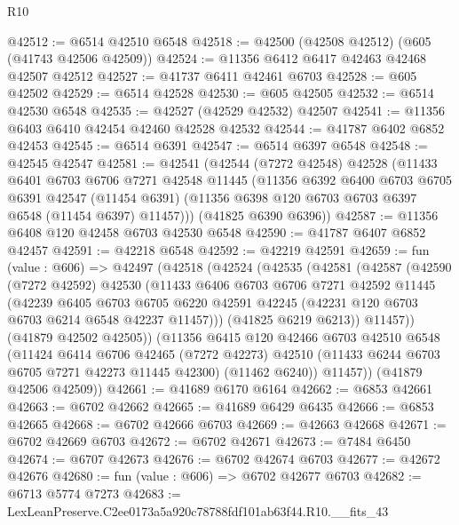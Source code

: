 \begin{lexlean}{R10}
\begin{coremodule}
@42512 := @6514 @42510 @6548
@42518 := @42500 (@42508 @42512) (@605 (@41743 @42506 @42509))
@42524 := @11356 @6412 @6417 @42463 @42468 @42507 @42512
@42527 := @41737 @6411 @42461 @6703
@42528 := @605 @42502
@42529 := @6514 @42528
@42530 := @605 @42505
@42532 := @6514 @42530 @6548
@42535 := @42527 (@42529 @42532) @42507
@42541 := @11356 @6403 @6410 @42454 @42460 @42528 @42532
@42544 := @41787 @6402 @6852 @42453
@42545 := @6514 @6391
@42547 := @6514 @6397 @6548
@42548 := @42545 @42547
@42581 := @42541
    (@42544
      (@7272 @42548)
      @42528
      (@11433
        @6401
        @6703
        @6706
        @7271
        @42548
        @11445
        (@11356
          @6392
          @6400
          @6703
          @6705
          @6391
          @42547
          (@11454 @6391)
          (@11356 @6398 @120 @6703 @6703 @6397 @6548 (@11454 @6397) @11457)))
      (@41825 @6390 @6396))
@42587 := @11356 @6408 @120 @42458 @6703 @42530 @6548
@42590 := @41787 @6407 @6852 @42457
@42591 := @42218 @6548
@42592 := @42219 @42591
@42659 := fun (value : @606) =>
  @42497
    (@42518
      (@42524
        (@42535
          (@42581
            (@42587
              (@42590
                (@7272 @42592)
                @42530
                (@11433
                  @6406
                  @6703
                  @6706
                  @7271
                  @42592
                  @11445
                  (@42239
                    @6405
                    @6703
                    @6705
                    @6220
                    @42591
                    @42245
                    (@42231 @120 @6703 @6703 @6214 @6548 @42237 @11457)))
                (@41825 @6219 @6213))
              @11457))
          (@41879 @42502 @42505))
        (@11356
          @6415
          @120
          @42466
          @6703
          @42510
          @6548
          (@11424
            @6414
            @6706
            @42465
            (@7272 @42273)
            @42510
            (@11433 @6244 @6703 @6705 @7271 @42273 @11445 @42300)
            (@11462 @6240))
          @11457))
      (@41879 @42506 @42509))
@42661 := @41689 @6170 @6164
@42662 := @6853 @42661
@42663 := @6702 @42662
@42665 := @41689 @6429 @6435
@42666 := @6853 @42665
@42668 := @6702 @42666 @6703
@42669 := @42663 @42668
@42671 := @6702 @42669 @6703
@42672 := @6702 @42671
@42673 := @7484 @6450
@42674 := @6707 @42673
@42676 := @6702 @42674 @6703
@42677 := @42672 @42676
@42680 := fun (value : @606) => @6702 @42677 @6703
@42682 := @6713 @5774 @7273
@42683 := LexLeanPreserve.C2ee0173a5a920c78788fdf101ab63f44.R10.__fits_43

\end{coremodule}
\end{lexlean}
